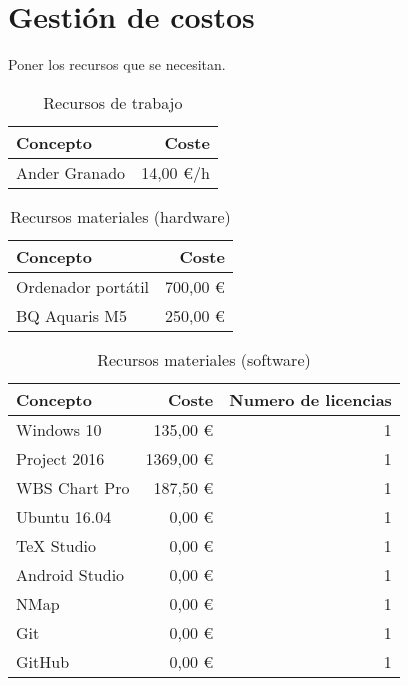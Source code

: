 
\section{Gestión de costos}
{\color{red} Poner los recursos que se necesitan.}

\begin{table}[H]
	\centering
	\begin{tabular}{ |l|r| } 
		\hline
		Concepto & Coste \\
		\hline
		Ander Granado & 14,00 \euro/h \\
		\hline
	\end{tabular}
	\caption{Recursos de trabajo}
	\label{table:recursos-trabajo}
\end{table}

\begin{table}[H]
	\centering
	\begin{tabular}{ |l|r| } 
		\hline
		Concepto & Coste \\
		\hline
		Ordenador portátil & 700,00 \euro \\
		BQ Aquaris M5 & 250,00 \euro \\
		\hline
	\end{tabular}
	\caption{Recursos materiales (hardware)}
	\label{table:recursos-materiales}
\end{table}

\begin{table}[H]
	\centering
	\begin{tabular}{ |l|r|r| } 
		\hline
		Concepto & Coste & Numero de licencias \\
		\hline
		Windows 10 & 135,00 \euro \cite{precio-win10} & 1 \\
		Project 2016 & 1369,00 \euro \cite{precio-project} & 1 \\
		WBS Chart Pro & 187,50 \euro \cite{precio-wbs} & 1 \\
		Ubuntu 16.04 & 0,00 \euro & 1 \\
		TeX Studio & 0,00 \euro & 1 \\
		Android Studio & 0,00 \euro & 1 \\
		NMap & 0,00 \euro & 1 \\
		Git & 0,00 \euro & 1 \\
		GitHub & 0,00 \euro & 1 \\
		\hline
	\end{tabular}
	\caption{Recursos materiales (software)}
	\label{table:recursos-software}
\end{table}

